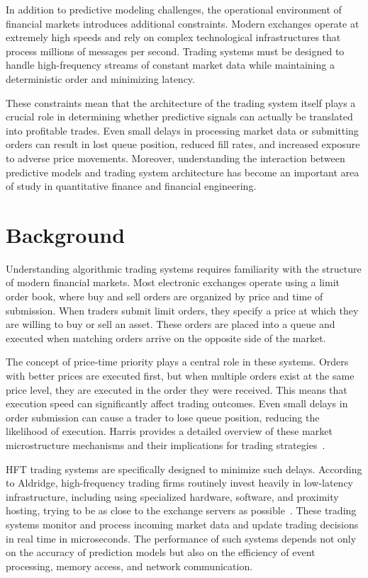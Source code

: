 \documentclass[12pt]{article}
\begin{document}
In addition to predictive modeling challenges, the operational environment of financial markets introduces additional constraints. 
Modern exchanges operate at extremely high speeds and rely on complex technological infrastructures that process millions of messages per second. 
Trading systems must be designed to handle high-frequency streams of constant market data while maintaining a deterministic order and minimizing latency.

These constraints mean that the architecture of the trading system itself plays a crucial role in determining whether predictive signals can actually be translated into profitable trades. 
Even small delays in processing market data or submitting orders can result in lost queue position, reduced fill rates, and increased exposure to adverse price movements. 
Moreover, understanding the interaction between predictive models and trading system architecture has become an important area of study in quantitative finance and financial engineering.

\section{Background}
Understanding algorithmic trading systems requires familiarity with the structure of modern financial markets. 
Most electronic exchanges operate using a limit order book, where buy and sell orders are organized by price and time of submission. 
When traders submit limit orders, they specify a price at which they are willing to buy or sell an asset. 
These orders are placed into a queue and executed when matching orders arrive on the opposite side of the market.

The concept of price-time priority plays a central role in these systems. 
Orders with better prices are executed first, but when multiple orders exist at the same price level, they are executed in the order they were received. 
This means that execution speed can significantly affect trading outcomes. Even small delays in order submission can cause a trader to lose queue position, reducing the likelihood of execution. 
Harris provides a detailed overview of these market microstructure mechanisms and their implications for trading strategies~\cite{harrisTrading}.

HFT trading systems are specifically designed to minimize such delays. 
According to Aldridge, high-frequency trading firms routinely invest heavily in low-latency infrastructure, including using specialized hardware, software, and proximity hosting, trying to be as close to the exchange servers as possible~\cite{aldridgeHFT}. 
These trading systems monitor and process incoming market data and update trading decisions in real time in microseconds. 
The performance of such systems depends not only on the accuracy of prediction models but also on the efficiency of event processing, memory access, and network communication.
\end{document}
